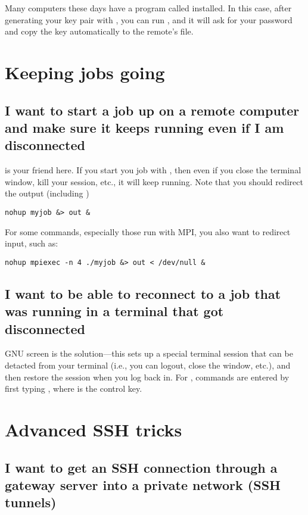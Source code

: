 Many computers these days have a program called  installed. In
this case, after generating your key pair with , you can run
, and it will ask for your password and
copy the key automatically to the remote's  file.


\section{Keeping jobs going}

\subsection{I want to start a job up on a remote computer and make sure it
keeps running even if I am disconnected}

 is your friend here. If you start you job with , then
even if you close the terminal window, kill your  session, etc., it
will keep running. Note that you should redirect the output (including
)

\begin{lstlisting}
nohup myjob &> out &
\end{lstlisting}

For some commands, especially those run with MPI, you also want to redirect
input, such as:

\begin{lstlisting}
nohup mpiexec -n 4 ./myjob &> out < /dev/null &
\end{lstlisting}

\subsection{I want to be able to reconnect to a job that was running in a
terminal that got disconnected}

GNU screen is the solution---this sets up a special terminal session that can
be detacted from your terminal (i.e., you can logout, close the window, etc.),
and then restore the session when you log back in. For , commands
are entered by first typing , where \cmd{^} is the control key.

\section{Advanced SSH tricks}

\subsection{I want to get an SSH connection through a gateway server into a
private network (SSH tunnels)}

